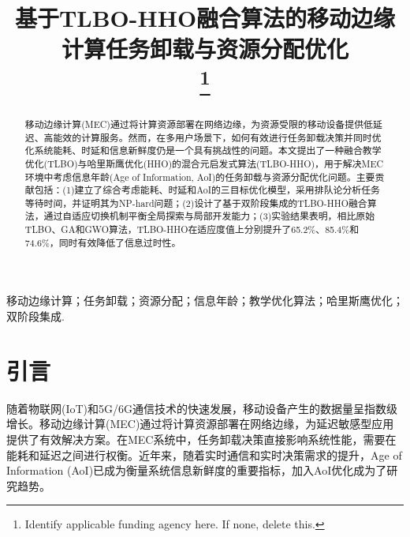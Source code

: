\documentclass[conference]{IEEEtran}
\begin{document}
\title{基于TLBO-HHO融合算法的移动边缘计算任务卸载与资源分配优化\\
\thanks{Identify applicable funding agency here. If none, delete this.}
}

\author{
\and
{}
\and
{}
}

\maketitle

\begin{abstract}
移动边缘计算(MEC)通过将计算资源部署在网络边缘，为资源受限的移动设备提供低延迟、高能效的计算服务。然而，在多用户场景下，如何有效进行任务卸载决策并同时优化系统能耗、时延和信息新鲜度仍是一个具有挑战性的问题。本文提出了一种融合教学优化(TLBO)与哈里斯鹰优化(HHO)的混合元启发式算法(TLBO-HHO)，用于解决MEC环境中考虑信息年龄(Age of Information, AoI)的任务卸载与资源分配优化问题。主要贡献包括：(1)建立了综合考虑能耗、时延和AoI的三目标优化模型，采用排队论分析任务等待时间，并证明其为NP-hard问题；(2)设计了基于双阶段集成的TLBO-HHO融合算法，通过自适应切换机制平衡全局探索与局部开发能力；(3)实验结果表明，相比原始TLBO、GA和GWO算法，TLBO-HHO在适应度值上分别提升了65.2\%、85.4\%和74.6\%，同时有效降低了信息过时性。
\end{abstract}

\begin{IEEEkeywords}
移动边缘计算；任务卸载；资源分配；信息年龄；教学优化算法；哈里斯鹰优化；双阶段集成.
\end{IEEEkeywords}

\section{引言}
随着物联网(IoT)和5G/6G通信技术的快速发展，移动设备产生的数据量呈指数级增长。移动边缘计算(MEC)通过将计算资源部署在网络边缘，为延迟敏感型应用提供了有效解决方案\cite{b1}。在MEC系统中，任务卸载决策直接影响系统性能，需要在能耗和延迟之间进行权衡。近年来，随着实时通信和实时决策需求的提升，Age of Information (AoI)已成为衡量系统信息新鲜度的重要指标\cite{b18}，加入AoI优化成为了研究趋势。
\end{document}
